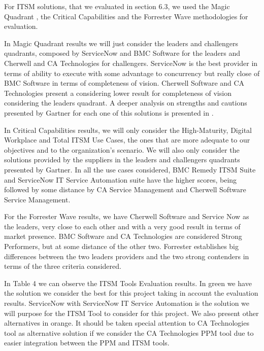 For ITSM solutions, that we evaluated in section 6.3, we used the Magic Quadrant , the Critical Capabilities and the Forrester Wave methodologies for evaluation.\par
In Magic Quadrant results we will just consider the leaders and challengers quadrants, composed by ServiceNow and BMC Software for the leaders and Cherwell and CA Technologies for challengers. ServiceNow is the best provider in terms of ability to execute with some advantage to concurrency but really close of BMC Software in terms of completeness of vision. Cherwell Software and CA Technologies present a considering lower result for completeness of vision considering the leaders quadrant. A deeper analysis on strengths and cautions presented by Gartner for each one of this solutions is presented in \cite{magicQuadrantITSM}.\par
In Critical Capabilities results, we will only consider the High-Maturity, Digital Workplace and Total ITSM Use Cases, the ones that are more adequate to our objectives and to the organization's scenario. We will also only consider the solutions provided by the suppliers in the leaders and challengers quadrants presented by Gartner. In all the use cases considered, BMC Remedy ITSM Suite and ServiceNow IT Service Automation suite have the higher scores, being followed by some distance by CA Service Management and Cherwell Software Service Management.\par
For the Forrester Wave results, we have Cherwell Software and Service Now as the leaders, very close to each other and with a very good result in terms of market presence. BMC Software and CA Technologies are considered Strong Performers, but at some distance of the other two. Forrester establishes big differences between the two leaders providers and the two strong contenders in terms of the three criteria considered.\par
In Table 4 we can observe the ITSM Tools Evaluation results. In green we have the solution we consider the best for this project taking in account the evaluation results. ServiceNow with ServiceNow IT Service Automation is the solution we will purpose for the ITSM Tool to consider for this project. We also present other alternatives in orange. It should be taken special attention to CA Technologies tool as alternative solution if we consider the CA Technologies PPM tool due to easier integration between the PPM and ITSM tools.\par


